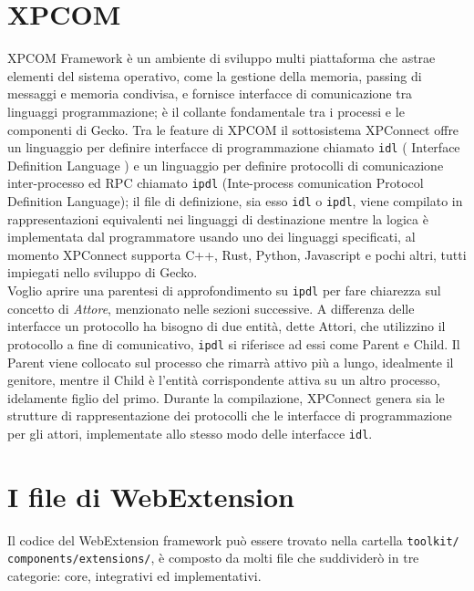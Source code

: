 \documentclass{sapthesis}
\newcommand{\code}[1]{\texttt{#1}}
\newcommand{\file}[1]{\code{#1}}
\newcommand{\idl}{\code{idl}}
\newcommand{\ipdl}{\code{ipdl}}
\begin{document}
    \section{XPCOM}
    \label{sec:xpcom}
        XPCOM Framework è un ambiente di sviluppo multi piattaforma che astrae elementi del sistema operativo,
        come la gestione della memoria, passing di messaggi e memoria condivisa, e fornisce interfacce di 
        comunicazione tra linguaggi programmazione; è il collante fondamentale tra i processi e le componenti di
        Gecko. Tra le feature di XPCOM il sottosistema XPConnect offre un linguaggio per definire
        interfacce di programmazione chiamato \idl{} ( Interface Definition Language ) e un linguaggio per definire protocolli
        di comunicazione inter-processo ed RPC chiamato \ipdl{} (Inte-process comunication Protocol Definition Language);
        il file di definizione, sia esso \idl{} o \ipdl{}, viene compilato in rappresentazioni equivalenti nei linguaggi
        di destinazione mentre la logica è implementata dal programmatore usando uno dei linguaggi specificati,
        al momento XPConnect supporta C++, Rust, Python, Javascript e pochi altri, tutti impiegati nello sviluppo
        di Gecko.\\
        Voglio aprire una parentesi di approfondimento su \ipdl{} per fare chiarezza sul concetto di \textit{Attore}, 
        menzionato nelle sezioni successive. A differenza delle interfacce un protocollo ha bisogno di due entità,
        dette Attori, che utilizzino il protocollo a fine di comunicativo, \ipdl{} si riferisce ad essi come 
        Parent e Child. Il Parent viene collocato sul processo che rimarrà attivo più a lungo, idealmente il genitore, 
        mentre il Child è l'entità corrispondente attiva su un altro processo, idelamente figlio del primo.
        Durante la compilazione, XPConnect genera sia le strutture di rappresentazione dei protocolli che le
        interfacce di programmazione per gli attori, implementate allo stesso modo delle interfacce \idl{}.


    \section{I file di WebExtension}
    \label{sec:webextension-files}
        Il codice del WebExtension framework può essere trovato nella cartella \file{toolkit/} \file{components/extensions/}, è composto
        da molti file che suddividerò in tre categorie: core, integrativi ed implementativi.\\
\end{document}
